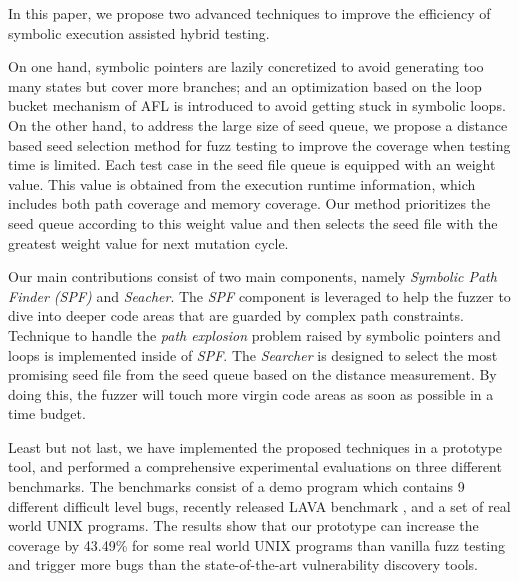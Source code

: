  In this paper, we propose two advanced techniques to improve the efficiency of symbolic execution assisted hybrid testing.

 On one hand, symbolic pointers are lazily concretized to avoid generating too many states but cover more branches; and an optimization based on the loop bucket mechanism of AFL \cite{online:afl} is introduced to avoid getting stuck in symbolic loops.
 On the other hand, to address the large size of seed queue, 
 we propose a distance based seed selection method for fuzz testing to improve the coverage when testing time is limited. 
 Each test case in the seed file queue is equipped with an weight value.
 This value is obtained from the execution runtime information,
 which includes both path coverage and memory coverage.
 Our method prioritizes the seed queue according to this weight value and 
 then selects the seed file with the greatest weight value for next mutation cycle.


 Our main contributions consist of two main components, namely \emph{Symbolic Path Finder (SPF)} and \emph{Seacher}. 
 The \emph{SPF} component is leveraged to help the fuzzer to dive into deeper code areas 
 that are guarded by complex path constraints. 
 Technique to handle the \textit{path explosion} problem 
 raised by symbolic pointers and loops is implemented inside of \emph{SPF}. 
 The \emph{Searcher} is designed to select the most promising seed file 
 from the seed queue based on the distance measurement. 
 By doing this, the fuzzer will touch more virgin code areas as soon as possible in a time budget. 

 Least but not last,  we have implemented the proposed techniques in a prototype tool,
 and performed a comprehensive experimental evaluations on three different benchmarks. The benchmarks consist of a demo program which contains 9 different difficult level bugs, recently released LAVA benchmark \cite{dolan2016lava}, and a set of real world UNIX programs. 
 The results show that our prototype can increase the coverage by 43.49\% for some real world UNIX programs than vanilla fuzz testing and trigger more bugs than the state-of-the-art vulnerability discovery tools.

